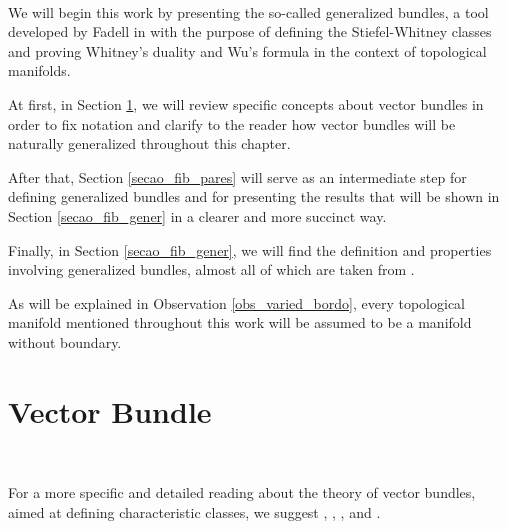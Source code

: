 \documentclass[12pt,oneside]{book}
\begin{document}
    \

    We will begin this work by presenting the so-called generalized bundles, a 
    tool developed by Fadell in \cite{fadell_1} with the purpose of defining the Stiefel-Whitney 
    classes and proving Whitney's duality and Wu's 
    formula in the context of topological manifolds.

    At first, in Section \ref{secao_fib_vet}, we will review specific concepts about vector bundles in 
    order to fix notation and clarify to the reader how vector bundles will be naturally generalized 
    throughout this chapter.

    After that, Section \ref{secao_fib_pares} will serve as an intermediate step for defining generalized 
    bundles and for presenting the results that will be shown in Section \ref{secao_fib_gener} in a 
    clearer and more succinct way.

    Finally, in Section \ref{secao_fib_gener}, we will find the definition and properties involving 
    generalized bundles, almost all of which are taken from \cite{fadell_1}.

    As will be explained in Observation \ref{obs_varied_bordo}, every topological manifold mentioned 
    throughout this work will be assumed to be a manifold without boundary.



    \section{Vector Bundle}\label{secao_fib_vet}

    \

    For a more specific and detailed reading about the theory of vector bundles, aimed at defining characteristic classes, we suggest 
    \cite{alex}, \cite{hatcher_2}, \cite{husemoller}, and \cite{milnor_1}.
\end{document}
